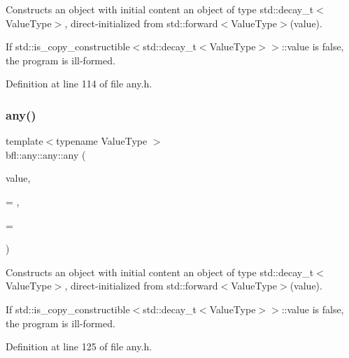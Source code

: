 Constructs an object with initial content an object of type std\+::decay\+\_\+t$<$\+Value\+Type$>$, direct-\/initialized from std\+::forward$<$\+Value\+Type$>$(value). 

If std\+::is\+\_\+copy\+\_\+constructible$<$std\+::decay\+\_\+t$<$\+Value\+Type$>$$>$\+::value is false, the program is ill-\/formed. 

Definition at line 114 of file any.\+h.

\mbox{\label{classbfl_1_1any_1_1any_acb42da22b210ada4113f26025548175c}} 
\subsubsection{\texorpdfstring{any()}{any()}\hspace{0.1cm}{\footnotesize\ttfamily [5/5]}}
{\footnotesize\ttfamily template$<$typename Value\+Type $>$ \\
bfl\+::any\+::any\+::any (\begin{DoxyParamCaption}\item[{Value\+Type \&\&}]{value,  }\item[{typename std\+::enable\+\_\+if$<$!std\+::is\+\_\+same$<$ \mbox{\hyperlink{classbfl_1_1any_1_1any}{any}} \&, Value\+Type $>$\+::value $>$\+::\mbox{\hyperlink{classbfl_1_1any_1_1any_ad84c3b30ce2ed9d04fe28465b60f2500}{type}} $\ast$}]{ = {},  }\item[{typename std\+::enable\+\_\+if$<$!std\+::is\+\_\+const$<$ Value\+Type $>$\+::value $>$\+::\mbox{\hyperlink{classbfl_1_1any_1_1any_ad84c3b30ce2ed9d04fe28465b60f2500}{type}} $\ast$}]{ = {} }\end{DoxyParamCaption})\hspace{0.3cm}{\ttfamily [inline]}}



Constructs an object with initial content an object of type std\+::decay\+\_\+t$<$\+Value\+Type$>$, direct-\/initialized from std\+::forward$<$\+Value\+Type$>$(value). 

If std\+::is\+\_\+copy\+\_\+constructible$<$std\+::decay\+\_\+t$<$\+Value\+Type$>$$>$\+::value is false, the program is ill-\/formed. 

Definition at line 125 of file any.\+h.

\mbox{\label{classbfl_1_1any_1_1any_a14390d38352d52e2a447dc62d0b19941}} 
